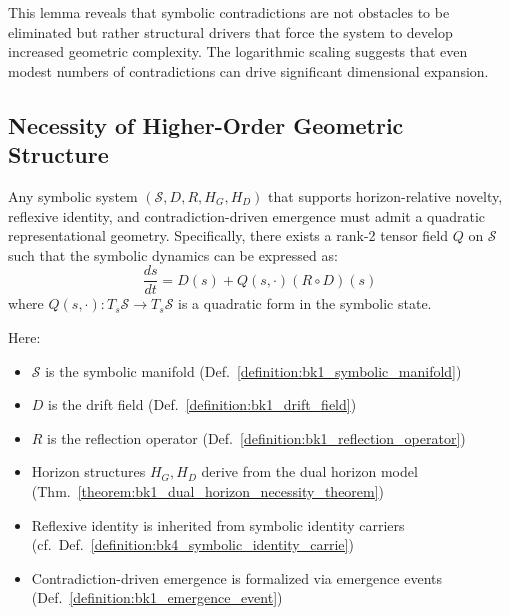 This lemma reveals that symbolic contradictions are not obstacles to be eliminated but rather structural drivers that force the system to develop increased geometric complexity. The logarithmic scaling suggests that even modest numbers of contradictions can drive significant dimensional expansion.

\subsection{Necessity of Higher-Order Geometric Structure}
\label{subsec:bk1_necessity_higher_order_structure}

\begin{theorem}
\label{theorem:bk1_quadratic_structure_necessity}
Any symbolic system $(\mathcal{S}, D, R, H_G, H_D)$ that supports horizon-relative novelty, reflexive identity, and contradiction-driven emergence must admit a quadratic representational geometry. Specifically, there exists a rank-2 tensor field $Q$ on $\mathcal{S}$ such that the symbolic dynamics can be expressed as:
\[
\frac{ds}{dt} = D(s) + Q(s, \cdot)(R \circ D)(s)
\]
where $Q(s, \cdot): T_s\mathcal{S} \to T_s\mathcal{S}$ is a quadratic form in the symbolic state.

Here:
\begin{itemize}
    \item $\mathcal{S}$ is the symbolic manifold (Def.~\ref{definition:bk1_symbolic_manifold})
    \item $D$ is the drift field (Def.~\ref{definition:bk1_drift_field})
    \item $R$ is the reflection operator (Def.~\ref{definition:bk1_reflection_operator})
    \item Horizon structures $H_G, H_D$ derive from the dual horizon model (Thm.~\ref{theorem:bk1_dual_horizon_necessity_theorem})
    \item Reflexive identity is inherited from symbolic identity carriers (cf.~Def.~\ref{definition:bk4_symbolic_identity_carrie})
    \item Contradiction-driven emergence is formalized via emergence events (Def.~\ref{definition:bk1_emergence_event})
\end{itemize}
\end{theorem}


